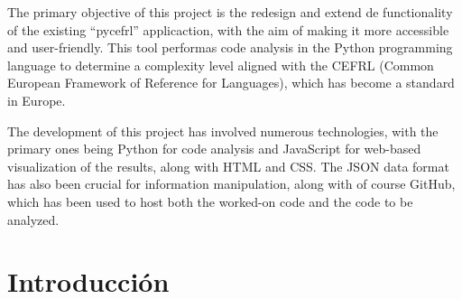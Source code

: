 \documentclass[a4paper, 12pt]{book}
\begin{document}
The primary objective of this project is the redesign and extend de functionality of the existing ``pycefrl'' applicaction, with the aim of making it more accessible and user-friendly. This tool performas code analysis in the Python programming language to determine a complexity level aligned with the CEFRL (Common European Framework of Reference for Languages), which has become a standard in Europe.

The development of this project has involved numerous technologies, with the primary ones being Python for code analysis and JavaScript for web-based visualization of the results, along with HTML and CSS. The JSON data format has also been crucial for information manipulation, along with of course GitHub, which has been used to host both the worked-on code and the code to be analyzed.



\tableofcontents 
\cleardoublepage
\listoffigures %



\cleardoublepage
\chapter{Introducción}
\label{sec:intro} %

\end{document}
